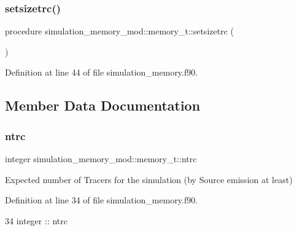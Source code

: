 \subsubsection{\texorpdfstring{setsizetrc()}{setsizetrc()}}
{\footnotesize\ttfamily procedure simulation\+\_\+memory\+\_\+mod\+::memory\+\_\+t\+::setsizetrc (\begin{DoxyParamCaption}{ }\end{DoxyParamCaption})\hspace{0.3cm}{\ttfamily [private]}}



Definition at line 44 of file simulation\+\_\+memory.\+f90.



\subsection{Member Data Documentation}
\mbox{\label{structsimulation__memory__mod_1_1memory__t_a81817d80225138c83e43d67531f7c1f2}} 
\subsubsection{\texorpdfstring{ntrc}{ntrc}}
{\footnotesize\ttfamily integer simulation\+\_\+memory\+\_\+mod\+::memory\+\_\+t\+::ntrc\hspace{0.3cm}{\ttfamily [private]}}



Expected number of Tracers for the simulation (by Source emission at least) 



Definition at line 34 of file simulation\+\_\+memory.\+f90.


\begin{DoxyCode}
34         \textcolor{keywordtype}{integer} :: ntrc
\end{DoxyCode}
\mbox{\label{structsimulation__memory__mod_1_1memory__t_aa0426bef9384f95d4317ca5b03b63428}} 
